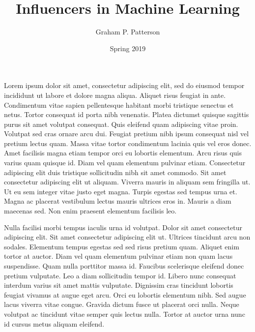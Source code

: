 \documentclass[12pt]{extarticle}
\title{Influencers in Machine Learning}
\author{Graham P. Patterson}
\date{Spring 2019}
\begin{document}
\maketitle

Lorem ipsum dolor sit amet, consectetur adipiscing elit, sed do eiusmod tempor incididunt ut labore et dolore magna aliqua. Aliquet risus feugiat in ante. Condimentum vitae sapien pellentesque habitant morbi tristique senectus et netus. Tortor consequat id porta nibh venenatis. Platea dictumst quisque sagittis purus sit amet volutpat consequat. Quis eleifend quam adipiscing vitae proin. Volutpat sed cras ornare arcu dui. Feugiat pretium nibh ipsum consequat nisl vel pretium lectus\cite{scikit-learn} quam. Massa vitae tortor condimentum lacinia quis vel eros donec. Amet facilisis magna etiam tempor orci eu lobortis elementum. Arcu risus quis varius quam quisque id. Diam vel quam elementum pulvinar etiam. Consectetur adipiscing elit duis tristique sollicitudin nibh sit amet commodo. Sit amet consectetur adipiscing elit ut aliquam. Viverra mauris in aliquam sem fringilla ut. Ut eu sem integer vitae justo eget magna. Turpis egestas sed tempus urna et. Magna ac placerat vestibulum lectus mauris ultrices eros in. Mauris a diam maecenas sed. Non enim praesent elementum facilisis leo.

Nulla facilisi morbi tempus iaculis urna id volutpat. Dolor sit amet consectetur adipiscing elit. Sit amet consectetur adipiscing elit ut. Ultrices tincidunt arcu non sodales. Elementum tempus egestas sed sed risus pretium quam. Aliquet enim tortor at auctor. Diam vel quam elementum pulvinar etiam non quam lacus suspendisse. Quam nulla porttitor massa id. Faucibus scelerisque eleifend donec pretium vulputate. Leo a diam sollicitudin tempor id. Libero nunc consequat interdum varius sit amet mattis vulputate. Dignissim cras tincidunt lobortis feugiat vivamus at augue eget arcu. Orci eu lobortis elementum nibh. Sed augue lacus viverra vitae congue. Gravida dictum fusce ut placerat orci nulla. Neque volutpat ac tincidunt vitae semper quis lectus nulla. Tortor at auctor urna nunc id cursus metus aliquam eleifend.



\end{document}
